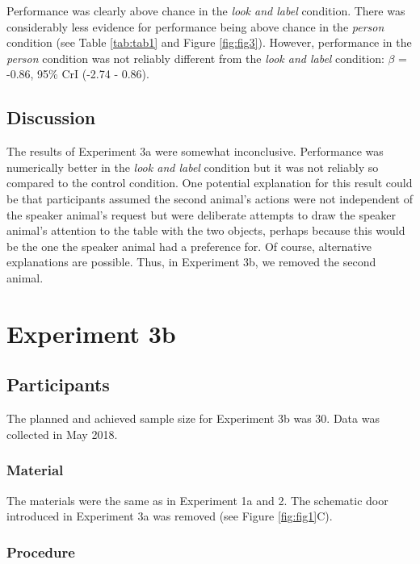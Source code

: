 \documentclass[
  man,floatsintext]{apa6}
\begin{document}
Performance was clearly above chance in the \emph{look and label} condition. There was considerably less evidence for performance being above chance in the \emph{person} condition (see Table \ref{tab:tab1} and Figure \ref{fig:fig3}). However, performance in the \emph{person} condition was not reliably different from the \emph{look and label} condition: \(\beta\) = -0.86, 95\% CrI (-2.74 - 0.86).

\hypertarget{discussion-3}{%
\subsection{Discussion}\label{discussion-3}}

The results of Experiment 3a were somewhat inconclusive. Performance was numerically better in the \emph{look and label} condition but it was not reliably so compared to the control condition. One potential explanation for this result could be that participants assumed the second animal's actions were not independent of the speaker animal's request but were deliberate attempts to draw the speaker animal's attention to the table with the two objects, perhaps because this would be the one the speaker animal had a preference for. Of course, alternative explanations are possible. Thus, in Experiment 3b, we removed the second animal.

\hypertarget{experiment-3b}{%
\section{Experiment 3b}\label{experiment-3b}}

\hypertarget{participants-4}{%
\subsection{Participants}\label{participants-4}}

The planned and achieved sample size for Experiment 3b was 30. Data was collected in May 2018.

\hypertarget{material-4}{%
\subsubsection{Material}\label{material-4}}

The materials were the same as in Experiment 1a and 2. The schematic door introduced in Experiment 3a was removed (see Figure \ref{fig:fig1}C).

\hypertarget{procedure-4}{%
\subsubsection{Procedure}\label{procedure-4}}
\end{document}
